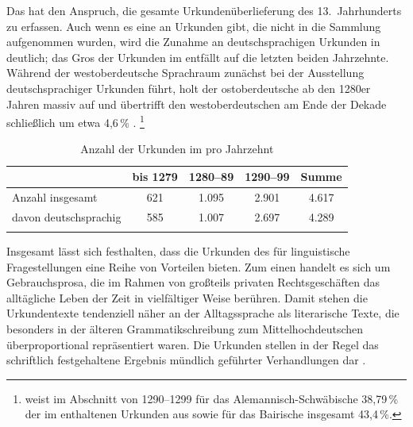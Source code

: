 Das \CAO{} hat den Anspruch, die gesamte
Urkundenüberlieferung des 13.~Jahrhunderts zu
erfassen. Auch wenn es eine  an Urkunden gibt, die nicht in die
Sammlung aufgenommen wurden, wird die Zunahme an deutschsprachigen Urkunden in
 deutlich; das Gros der Urkunden im \CAO{} entfällt auf die
letzten beiden Jahrzehnte. Während der westoberdeutsche
Sprachraum zunächst bei der Ausstellung deutschsprachiger
Urkunden führt, holt der ostoberdeutsche ab den 1280er Jahren
massiv auf und übertrifft den westoberdeutschen am Ende der
Dekade schließlich um etwa 4,6\,\% \autocite[46--47]{ganslmayer2012}.%
%
	\footnote{\citet[47]{ganslmayer2012} weist im Abschnitt von 1290--1299 für
		das Alemannisch-Schwäbische 38,79\,\%
		der im \CAO{} enthaltenen Urkunden aus sowie für das
		Bairische insgesamt 43,4\,\%. }

\begin{table}
\centering
\caption{Anzahl der Urkunden im 
pro Jahrzehnt \autocite[40]{ganslmayer2012}}
\begin{tabularx}{\textwidth}{l C C C C}
\lsptoprule
%
	& {bis 1279}
	& {1280--89}
	& {1290--99}
	& {Summe}\\

\midrule

Anzahl insgesamt
	& 621
	& 1.095
	& 2.901
	& 4.617
	\\

davon deutschsprachig
	& 585
	& 1.007
	& 2.697
	& 4.289
	\\

\lspbottomrule
\end{tabularx}
\label{tab:urkstat}
\end{table}

Insgesamt lässt sich festhalten, dass die Urkunden des \CAO{} für
linguistische Fragestellungen eine Reihe von Vorteilen bieten. Zum einen
handelt es sich um Gebrauchsprosa, die im Rahmen
von großteils privaten Rechtsgeschäften das alltägliche Leben der Zeit in
vielfältiger Weise berühren. Damit stehen die Urkundentexte tendenziell näher
an der Alltagssprache als literarische Texte, die besonders in der älteren
Grammatikschreibung zum Mittelhochdeutschen überproportional repräsentiert
waren. Die Urkunden stellen in der Regel das schriftlich
festgehaltene Ergebnis mündlich geführter Verhandlungen dar
\autocite[595]{schmidtwiegand1998b}.

